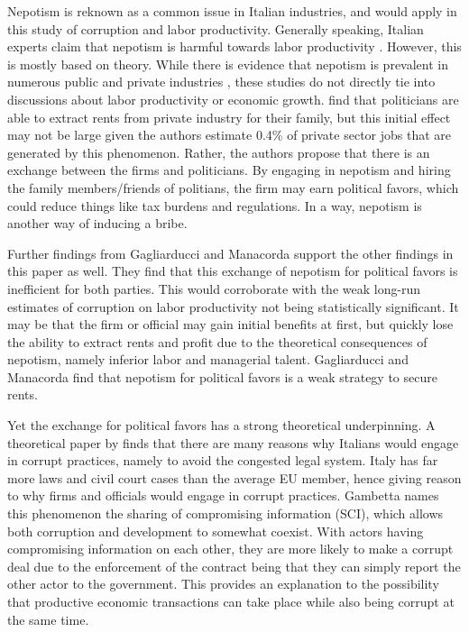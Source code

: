 \documentclass[12pt]{article} %
\begin{document}
Nepotism is reknown as a common issue in Italian industries, and would apply in this study of corruption and labor productivity. Generally speaking, Italian experts claim that nepotism is harmful towards labor productivity \citep{tyler_smith_clean_2020}. However, this is mostly based on theory. While there is evidence that nepotism is prevalent in numerous public and private industries \citep{durante_academic_2011, gagliarducci_politics_2020}, these studies do not directly tie into discussions about labor productivity or economic growth. \citet{gagliarducci_politics_2020} find that politicians are able to extract rents from private industry for their family, but this initial effect may not be large given the authors estimate 0.4\% of private sector jobs that are generated by this phenomenon. Rather, the authors propose that there is an exchange between the firms and politicians. By engaging in nepotism and hiring the family members/friends of politians, the firm may earn political favors, which could reduce things like tax burdens and regulations. In a way, nepotism is another way of inducing a bribe. 

Further findings from Gagliarducci and Manacorda support the other findings in this paper as well. They find that this exchange of nepotism for political favors is inefficient for both parties. This would corroborate with the weak long-run estimates of corruption on labor productivity not being statistically significant. It may be that the firm or official may gain initial benefits at first, but quickly lose the ability to extract rents and profit due to the theoretical consequences of nepotism, namely inferior labor and managerial talent. Gagliarducci and Manacorda find that nepotism for political favors is a weak strategy to secure rents. 

Yet the exchange for political favors has a strong theoretical underpinning. A theoretical paper by \citet{gambetta_why_2018} finds that there are many reasons why Italians would engage in corrupt practices, namely to avoid the congested legal system. Italy has far more laws and civil court cases than the average EU member, hence giving reason to why firms and officials would engage in corrupt practices. Gambetta names this phenomenon the sharing of compromising information (SCI), which allows both corruption and development to somewhat coexist. With actors having compromising information on each other, they are more likely to make a corrupt deal due to the enforcement of the contract being that they can simply report the other actor to the government. This provides an explanation to the possibility that productive economic transactions can take place while also being corrupt at the same time. 
\end{document}
